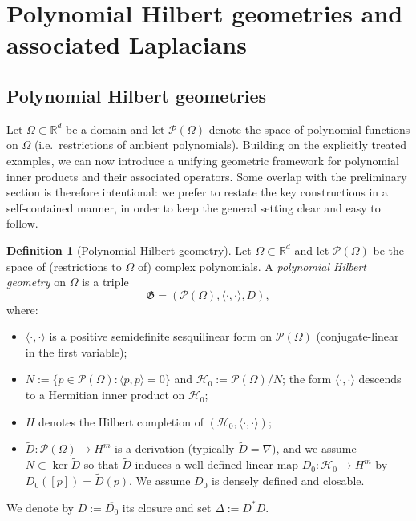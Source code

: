 \documentclass{amsart}
\numberwithin{equation}{section}
\theoremstyle{definition}
\newtheorem{definition}[theorem]{Definition}
\theoremstyle{remark}
\begin{document}
\section{Polynomial Hilbert geometries and associated Laplacians}
\label{sec:abstract-setting}

\subsection{Polynomial Hilbert geometries}

Let $\Omega\subset\mathbb R^d$ be a domain and let $\mathcal P(\Omega)$ denote the space of polynomial functions on $\Omega$ (i.e.\ restrictions of ambient polynomials).
Building on the explicitly treated examples, we can now introduce a unifying geometric framework for polynomial inner products and their associated operators. Some overlap with the preliminary section is therefore intentional: we prefer to restate the key constructions in a self-contained manner, in order to keep the general setting clear and easy to follow.

\begin{definition}[Polynomial Hilbert geometry]
Let $\Omega\subset\mathbb{R}^d$ and let $\mathcal P(\Omega)$ be the space of (restrictions to $\Omega$ of) complex polynomials.
A \emph{polynomial Hilbert geometry} on $\Omega$ is a triple
\[
\mathfrak G=(\mathcal P(\Omega),\langle\cdot,\cdot\rangle,D),
\]
where:
\begin{itemize}
  \item $\langle\cdot,\cdot\rangle$ is a positive semidefinite sesquilinear form on $\mathcal P(\Omega)$
  (conjugate-linear in the first variable);
  \item $N:=\{p\in\mathcal P(\Omega):\langle p,p\rangle=0\}$ and
  $\mathcal H_0:=\mathcal P(\Omega)/N$; the form $\langle\cdot,\cdot\rangle$ descends to a Hermitian inner product on $\mathcal H_0$;
  \item $H$ denotes the Hilbert completion of $(\mathcal H_0,\langle\cdot,\cdot\rangle)$;
  \item $\widetilde D:\mathcal P(\Omega)\to H^m$ is a derivation (typically $\widetilde D=\nabla$),
and we assume $N\subset\ker \widetilde D$ so that $\widetilde D$ induces a well-defined linear map
$D_0:\mathcal H_0\to H^m$ by $D_0([p])=\widetilde D(p)$.
We assume $D_0$ is densely defined and closable.
\end{itemize}
We denote by $D:=\overline{D_0}$ its closure and set $\Delta:=D^*D$.
\end{definition}
\end{document}
